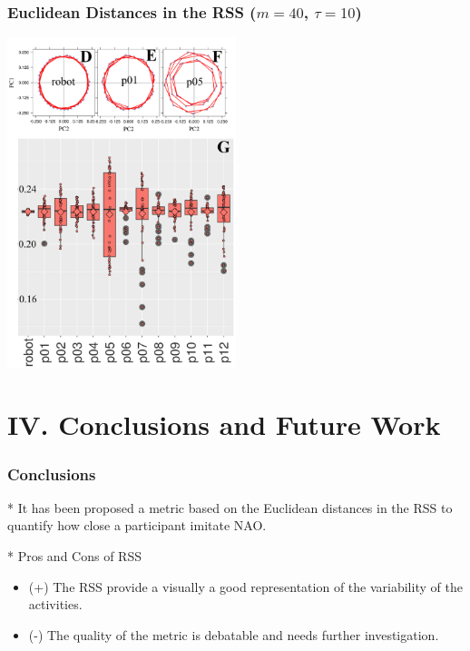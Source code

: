 \documentclass{beamer}
\begin{document}
\begin{frame}
\frametitle{Euclidean Distances in the RSS ($m=40$, $\tau=10$)}


\vspace{-10mm}

 \centering
\includegraphics[width=0.5\textwidth]{Xochicale2017Fig1b}



\end{frame}




\section{IV. Conclusions and Future Work}



\begin{frame}
\frametitle{Conclusions}
\vspace{-0.7cm}

* It has been proposed a metric based on the Euclidean distances in the RSS
to quantify how close a participant imitate NAO.

* Pros and Cons of RSS
    \begin{itemize}
    \item (+) The RSS provide a visually a good representation of the variability of the
    activities.
    \item (-) The quality of the metric is debatable and needs further investigation.
    \end{itemize}


\end{frame}
\end{document}
